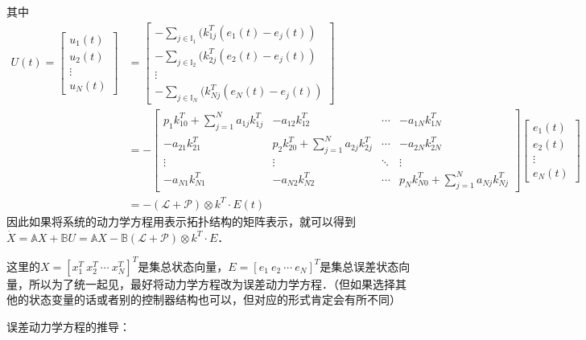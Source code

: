 其中
\begin{equation}
\begin{aligned}
U(t)=\begin{bmatrix}
u_{1}(t) \\
u_{2}(t)  \\
\vdots  \\
u_{N}(t)
\end{bmatrix}
&=\begin{bmatrix}
-\sum_{j\in \mathbb{I}_{1} }^{}(k_{1j}^T(e _{1}(t)-e_{j}(t)) \\
-\sum_{j\in \mathbb{I}_{2} }^{}(k_{2j}^T(e _{2}(t)-e_{j}(t))\\
\vdots   \\
-\sum_{j\in \mathbb{I}_{N} }^{}(k_{Nj}^T(e _{N}(t)-e_{j}(t))
\end{bmatrix}\\
&=
-\begin{bmatrix}
p_{1}k_{10}^T+\sum_{j=1}^{N}a_{1j}k_{1j}^T   & -a_{12}k_{12}^T & \cdots  & -a_{1N}k_{1N}^T\\
-a_{21}k_{21}^T  &  p_{2}k_{20}^T+\sum_{j=1}^{N}a_{2j}k_{2j}^T& \cdots  &-a_{2N}k_{2N}^T \\
  \vdots & \vdots  & \ddots  & \vdots \\
-a_{N1}k_{N1}^T  & -a_{N2}k_{N2}^T & \cdots  &p_{N}k_{N0}^T+\sum_{j=1}^{N}a_{Nj}k_{Nj}^T
\end{bmatrix}\begin{bmatrix}
e _{1}(t) \\
e_{2}(t) \\
\vdots  \\
e_{N}(t)
\end{bmatrix}\\
&=-(\mathcal{L} +\mathcal{P})\otimes k^T\cdot E(t)
\end{aligned}
\end{equation}
因此如果将系统的动力学方程用表示拓扑结构的矩阵表示，就可以得到$\dot{X} =\mathbb{A}X+\mathbb{B} U=\mathbb{A}X-\mathbb{B}(\mathcal{L} +\mathcal{P})\otimes k^T\cdot E$．

这里的$X=[x _{1}^T\ x _{2}^T\ \cdots \ x _{N}^T]^T$是集总状态向量，$E=[e _{1}\ e _{2}\ \cdots \ e _{N}]^T$是集总误差状态向量，所以为了统一起见，最好将动力学方程改为误差动力学方程．（但如果选择其他的状态变量的话或者别的控制器结构也可以，但对应的形式肯定会有所不同）


误差动力学方程的推导：



